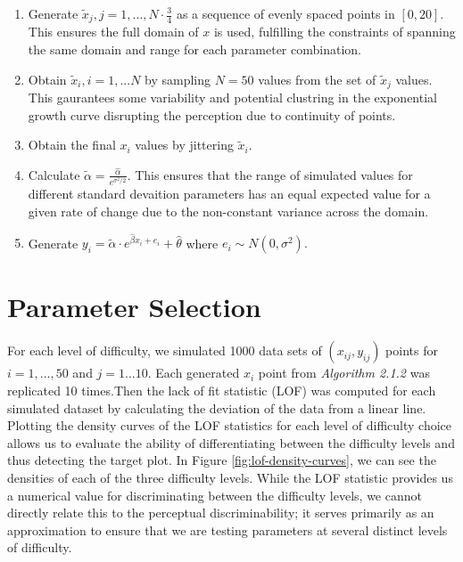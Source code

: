 \begin{appendix}
\begin{enumerate}
\def\labelenumi{\arabic{enumi}.}
\item
  Generate \(\tilde x_j, j = 1,..., N\cdot \frac{3}{4}\) as a sequence
  of evenly spaced points in \([0,20]\). This ensures the full domain of
  \(x\) is used, fulfilling the constraints of spanning the same domain
  and range for each parameter combination.
\item
  Obtain \(\tilde x_i, i = 1,...N\) by sampling \(N = 50\) values from
  the set of \(\tilde x_j\) values. This gaurantees some variability and
  potential clustring in the exponential growth curve disrupting the
  perception due to continuity of points.
\item
  Obtain the final \(x_i\) values by jittering \(\tilde x_i\).
\item
  Calculate \(\tilde\alpha = \frac{\hat\alpha}{e^{\sigma^2/2}}.\) This
  ensures that the range of simulated values for different standard
  devaition parameters has an equal expected value for a given rate of
  change due to the non-constant variance across the domain.
\item
  Generate
  \(y_i = \tilde\alpha\cdot e^{\hat\beta x_i + e_i}+\hat\theta\) where
  \(e_i\sim N(0,\sigma^2).\)
\end{enumerate}

\hypertarget{parameter-selection}{%
\section{\texorpdfstring{Parameter Selection
\label{app:parameters}}{Parameter Selection }}\label{parameter-selection}}

For each level of difficulty, we simulated 1000 data sets of
\((x_{ij}, y_{ij})\) points for \(i = 1,...,50\) and \(j = 1...10\).
Each generated \(x_i\) point from \textit{Algorithm 2.1.2} was
replicated 10 times.Then the lack of fit statistic (LOF) was computed
for each simulated dataset by calculating the deviation of the data from
a linear line. Plotting the density curves of the LOF statistics for
each level of difficulty choice allows us to evaluate the ability of
differentiating between the difficulty levels and thus detecting the
target plot. In Figure \ref{fig:lof-density-curves}, we can see the
densities of each of the three difficulty levels. While the LOF
statistic provides us a numerical value for discriminating between the
difficulty levels, we cannot directly relate this to the perceptual
discriminability; it serves primarily as an approximation to ensure that
we are testing parameters at several distinct levels of difficulty.


\end{appendix}
